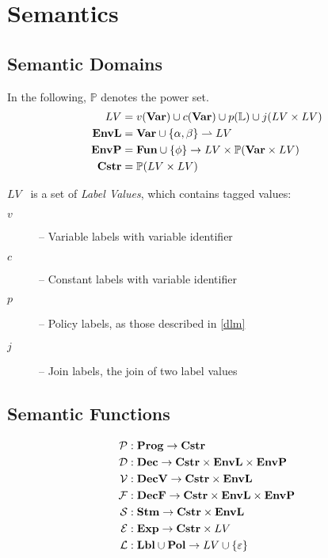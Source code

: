 
\newcommand{\iP}{\mathcal{P}}
\newcommand{\iD}{\mathcal{D}}
\newcommand{\iV}{\mathcal{V}}
\newcommand{\iF}{\mathcal{F}}
\newcommand{\iS}{\mathcal{S}}
\newcommand{\iE}{\mathcal{E}}
\newcommand{\iL}{\mathcal{L}}
\newcommand{\iO}{\mathcal{O}}

\newcommand{\iLV}{LV}

\newcommand{\dblSq}[1]{[\![ #1 ]\!]}

\newcommand{\rspace}{\\[1em]}
\newcommand{\dsWhere}[1]{\quad \text{ where } #1}
\newcommand{\dsAnd}[1]{\quad \text{ and } #1}
\newcommand{\dsIf}[1]{\quad \text{ if } #1}

\section{Semantics}

\subsection{Semantic Domains}
In the following, $\mathbb P$ denotes the power set.
\begin{align*}
\iLV      & = v(\iVar) \cup c(\iVar) \cup p(\mathbb{L}) \cup j(\iLV \times \iLV) \\
\iEnvL  & = \iVar \cup \{ \ia, \ib \} \rightharpoonup \iLV \\
\iEnvP  & = \iFun \cup \{ \ifb \} \rightarrow \iLV \times \mathbb P (\iVar \times \iLV) \\
\iCstr  & = \mathbb P (\iLV \times \iLV)
\end{align*}

$\iLV$~ is a set of \emph{Label Values}, which contains tagged values:
\begin{description}
  \item[$v$] -- Variable labels with variable identifier
  \item[$c$] -- Constant labels with variable identifier
  \item[$p$] -- Policy labels, as those described in \cref{dlm}
  \item[$j$] -- Join labels, the join of two label values
\end{description}

\subsection{Semantic Functions}
\begin{align*}
\iP & : \iProg \rightarrow \iCstr \\
\iD & : \iDec \rightarrow \iCstr \times \iEnvL \times \iEnvP \\
\iV & : \iDecv \rightarrow \iCstr \times \iEnvL \\
\iF & : \iDecf \rightarrow \iCstr \times \iEnvL \times \iEnvP \\
\iS & : \iStm \rightarrow \iCstr \times \iEnvL \\
\iE & : \iExp \rightarrow \iCstr \times \iLV \\
\iL & : \iLbl \cup \iPol \rightarrow \iLV \cup \{ \varepsilon \}
\end{align*}

